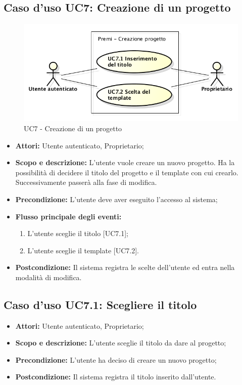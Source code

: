 \subsection{Caso d'uso UC7: Creazione di un progetto}
\begin{figure}[h] 
	\centering 
	\includegraphics[scale=0.45] {img/UC7.png}
	\caption{UC7 - Creazione di un progetto} 
\end{figure}

\begin{itemize}
	\item \textbf{Attori:} Utente autenticato, Proprietario;
	\item \textbf{Scopo e descrizione:} L'utente vuole creare un nuovo progetto. Ha la possibilità di decidere il titolo del progetto e il \gls{template} con cui crearlo. Successivamente passerà alla fase di modifica.
	\item \textbf{Precondizione:} L'utente deve aver eseguito l'accesso al sistema;
	\item \textbf{Flusso principale degli eventi:}
	\begin{enumerate}
		\item L'utente sceglie il titolo [UC7.1];
		\item L'utente sceglie il \gls{template} [UC7.2].
	\end{enumerate}
	\item \textbf{Postcondizione:} Il sistema registra le scelte dell'utente ed entra nella modalità di modifica.
\end{itemize}


\subsection{Caso d'uso UC7.1: Scegliere il titolo}
\begin{itemize}
	\item \textbf{Attori:} Utente autenticato, Proprietario;
	\item \textbf{Scopo e descrizione:} L'utente sceglie il titolo da dare al progetto;
	\item \textbf{Precondizione:} L'utente ha deciso di creare un nuovo progetto;
	\item \textbf{Postcondizione:} Il sistema registra il titolo inserito dall'utente.
\end{itemize}


